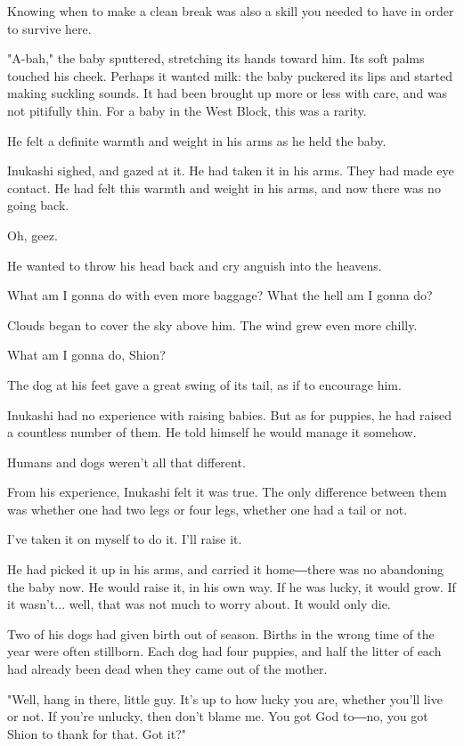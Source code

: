 Knowing when to make a clean break was also a skill you needed to have
in order to survive here.

"A-bah," the baby sputtered, stretching its hands toward him. Its soft
palms touched his cheek. Perhaps it wanted milk: the baby puckered its
lips and started making suckling sounds. It had been brought up more or
less with care, and was not pitifully thin. For a baby in the West
Block, this was a rarity.

He felt a definite warmth and weight in his arms as he held the baby.

Inukashi sighed, and gazed at it. He had taken it in his arms. They had
made eye contact. He had felt this warmth and weight in his arms, and
now there was no going back.

Oh, geez.

He wanted to throw his head back and cry anguish into the heavens.

What am I gonna do with even more baggage? What the hell am I gonna do?

Clouds began to cover the sky above him. The wind grew even more chilly.

What am I gonna do, Shion?

The dog at his feet gave a great swing of its tail, as if to encourage
him.

Inukashi had no experience with raising babies. But as for puppies, he
had raised a countless number of them. He told himself he would manage
it somehow.

Humans and dogs weren't all that different.

From his experience, Inukashi felt it was true. The only difference
between them was whether one had two legs or four legs, whether one had
a tail or not.

I've taken it on myself to do it. I'll raise it.

He had picked it up in his arms, and carried it home―there was no
abandoning the baby now. He would raise it, in his own way. If he was
lucky, it would grow. If it wasn't... well, that was not much to worry
about. It would only die.

Two of his dogs had given birth out of season. Births in the wrong time
of the year were often stillborn. Each dog had four puppies, and half
the litter of each had already been dead when they came out of the
mother.

"Well, hang in there, little guy. It's up to how lucky you are, whether
you'll live or not. If you're unlucky, then don't blame me. You got God
to―no, you got Shion to thank for that. Got it?"

